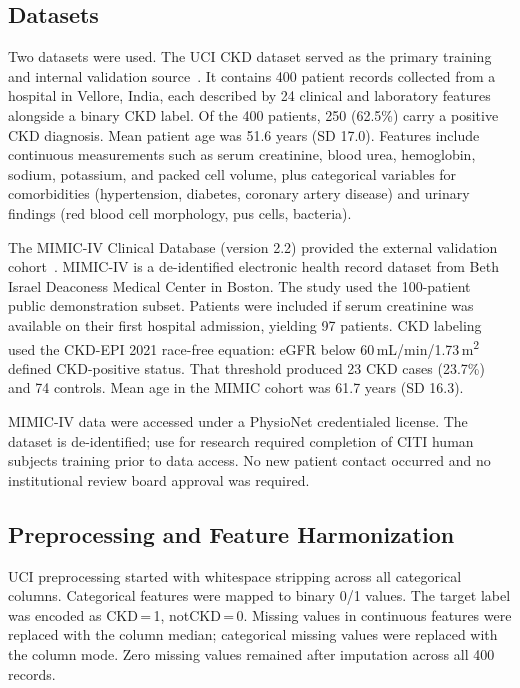 \subsection{Datasets}

Two datasets were used. The UCI CKD dataset served as the primary training and internal validation source~\cite{UCIDataset}. It contains 400 patient records collected from a hospital in Vellore, India, each described by 24 clinical and laboratory features alongside a binary CKD label. Of the 400 patients, 250 (62.5\%) carry a positive CKD diagnosis. Mean patient age was 51.6 years (SD 17.0). Features include continuous measurements such as serum creatinine, blood urea, hemoglobin, sodium, potassium, and packed cell volume, plus categorical variables for comorbidities (hypertension, diabetes, coronary artery disease) and urinary findings (red blood cell morphology, pus cells, bacteria).

The MIMIC-IV Clinical Database (version 2.2) provided the external validation cohort~\cite{Johnson2023}. MIMIC-IV is a de-identified electronic health record dataset from Beth Israel Deaconess Medical Center in Boston. The study used the 100-patient public demonstration subset. Patients were included if serum creatinine was available on their first hospital admission, yielding 97 patients. CKD labeling used the CKD-EPI 2021 race-free equation: eGFR below 60\,mL/min/1.73\,m\textsuperscript{2} defined CKD-positive status. That threshold produced 23 CKD cases (23.7\%) and 74 controls. Mean age in the MIMIC cohort was 61.7 years (SD 16.3).

MIMIC-IV data were accessed under a PhysioNet credentialed license. The dataset is de-identified; use for research required completion of CITI human subjects training prior to data access. No new patient contact occurred and no institutional review board approval was required.

\subsection{Preprocessing and Feature Harmonization}

UCI preprocessing started with whitespace stripping across all categorical columns. Categorical features were mapped to binary 0/1 values. The target label was encoded as CKD\,=\,1, notCKD\,=\,0. Missing values in continuous features were replaced with the column median; categorical missing values were replaced with the column mode. Zero missing values remained after imputation across all 400 records.

